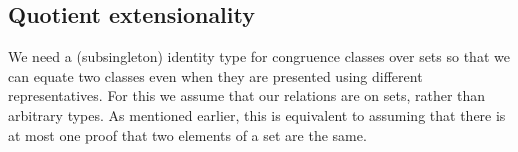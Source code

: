 \documentclass[a4paper,UKenglish,cleveref,autoref,thm-restate,11pt]{lipics-v2021}
\begin{document}
\subsection{Quotient extensionality}\label{quotient-extensionality}

We need a (subsingleton) identity type for congruence classes over sets so that we can equate two classes even when they are presented using different representatives. For this we assume that our relations are on sets, rather than arbitrary types. As mentioned earlier, this is equivalent to assuming that there is at most one proof that two elements of a set are the same.
\ccpad
\begin{code}%
\>[1]\AgdaSpace{}%
\AgdaSymbol{:}%
\>[200I]\AgdaSpace{}%
\AgdaSpace{}%
\AgdaSpace{}%
\AgdaSpace{}%
\AgdaSpace{}%
\AgdaSymbol{(}\AgdaSpace{}%
\AgdaSymbol{)}\AgdaSpace{}%
\AgdaSpace{}%
\AgdaSymbol{\{}\AgdaSpace{}%
\AgdaSpace{}%
\AgdaSymbol{:}\AgdaSpace{}%
\AgdaSymbol{\}}\<%
\\
\>[1][@{}l@{\AgdaIndent{0}}]%
\>[2]%
\>[.][@{}l@{}]\<[200I]%
\>[24]\AgdaSpace{}%
\AgdaSpace{}%
\AgdaSpace{}%
\AgdaSpace{}%
\AgdaSpace{}%
\AgdaSymbol{(}\AgdaSpace{}%
\AgdaSpace{}%
\AgdaSymbol{))}\AgdaSpace{}%
\AgdaSpace{}%
\AgdaSpace{}%
\<%
\\
%
\>[24]\AgdaComment{-----------------------------------------------------------------}\<%
\\
%
\>[2]%
\>[24]\AgdaSpace{}%
\AgdaSpace{}%
%
\>[32]%
\>[35]\AgdaOperator{\AgdaFunction{[}}\AgdaSpace{}%
\AgdaSpace{}%
\AgdaOperator{\AgdaFunction{]}}\AgdaSpace{}%
%
\>[44]%
\>[47]\AgdaOperator{\AgdaFunction{[}}\AgdaSpace{}%
\AgdaSpace{}%
\AgdaOperator{\AgdaFunction{]}}\AgdaSpace{}%
\<%
\\
%
\\[\AgdaEmptyExtraSkip]%
%
\>[1]\AgdaSpace{}%
\AgdaSpace{}%
\AgdaSpace{}%
\AgdaSymbol{\{}\AgdaSymbol{\}\{}\AgdaSymbol{\}}\AgdaSpace{}%
\AgdaSpace{}%
\AgdaSpace{}%
\AgdaSpace{}%
\AgdaSymbol{=}\AgdaSpace{}%
\AgdaSpace{}%
\AgdaSpace{}%
\AgdaSpace{}%
\AgdaSymbol{(}\AgdaSpace{}%
\AgdaSymbol{)(}\AgdaSpace{}%
\AgdaSymbol{)(}\AgdaSpace{}%
\AgdaSpace{}%
\AgdaSymbol{)}\<%
\end{code}
\end{document}
